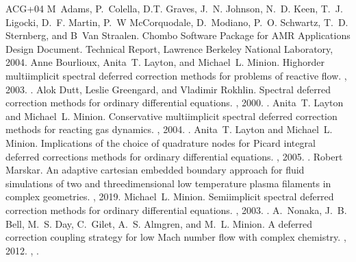 \documentclass[letterpaper,10pt,english]{sphinxmanual}
\begin{document}
\begin{sphinxthebibliography}{ACG+04}
M Adams, P. Colella, D.T. Graves, J. N. Johnson, N. D. Keen, T. J. Ligocki, D. F. Martin, P. W McCorquodale, D. Modiano, P. O. Schwartz, T. D. Sternberg, and B Van Straalen. Chombo Software Package for AMR Applications \sphinxhyphen{} Design Document. Technical Report, Lawrence Berkeley National Laboratory, 2004.
Anne Bourlioux, Anita T. Layton, and Michael L. Minion. High\sphinxhyphen{}order multi\sphinxhyphen{}implicit spectral deferred correction methods for problems of reactive flow. , 2003. .
Alok Dutt, Leslie Greengard, and Vladimir Rokhlin. Spectral deferred correction methods for ordinary differential equations. , 2000. .
Anita T. Layton and Michael L. Minion. Conservative multi\sphinxhyphen{}implicit spectral deferred correction methods for reacting gas dynamics. , 2004. .
Anita T. Layton and Michael L. Minion. Implications of the choice of quadrature nodes for Picard integral deferred corrections methods for ordinary differential equations. , 2005. .
Robert Marskar. An adaptive cartesian embedded boundary approach for fluid simulations of two\sphinxhyphen{} and three\sphinxhyphen{}dimensional low temperature plasma filaments in complex geometries. , 2019.
Michael L. Minion. Semi\sphinxhyphen{}implicit spectral deferred correction methods for ordinary differential equations. , 2003. .
A. Nonaka, J. B. Bell, M. S. Day, C. Gilet, A. S. Almgren, and M. L. Minion. A deferred correction coupling strategy for low Mach number flow with complex chemistry. , 2012. , .
\end{sphinxthebibliography}



\renewcommand{\indexname}{Index}
\printindex
\end{document}
